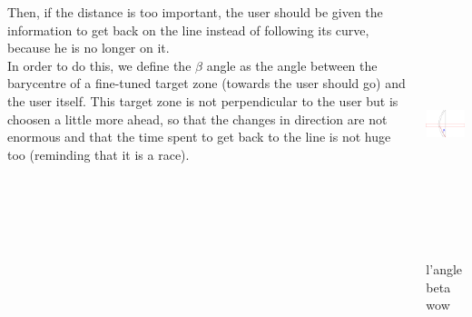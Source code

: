 \documentclass[17pt, a1paper, portrait]{tikzposter}
\begin{document}
\begin{columns}
{Then, if the distance is too important, the user should be given the
information to get back on the line instead of following its curve, because he
is no longer on it. \\
In order to do this, we define the \(\beta\) angle as the angle between the
barycentre of a fine-tuned target zone (towards the user should go) and the
user itself. This target zone is not perpendicular to the user but is choosen a
little more ahead, so that the changes in direction are not enormous and that
the time spent to get back to the line is not huge too (reminding that it is a
race).

\begin{center}
\includegraphics[height = 7cm, width = 6cm]{poster_images/angle_beta_barycentre_targetpoint.png}

\large l'angle beta wow
\end{center}

}



\end{columns}
\end{document}
